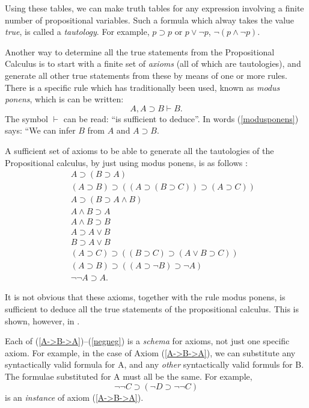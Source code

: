 Using these tables, we can make truth tables for any expression involving a finite number of propositional
variables. Such a formula which alway takes the value {\em true}, is called a {\em tautology}. For example,
$p\supset p$ or $p \vee \neg p$, $\neg (p\wedge\neg p)$.

Another way to determine all the true statements from the Propositional Calculus is to start with a finite
set of {\em axioms} (all of which are tautologies), and generate all other true statements from these by
means of one or more rules. There is a specific rule which has traditionally been used, known as {\em modus ponens},
which is can be written:
\begin{equation}\label{modusponens}
A, A \supset B \vdash B.
\end{equation}
The symbol $\vdash$ can be read: ``is sufficient to deduce''. In words (\ref{modusponens})
says: ``We can infer $B$ from $A$ and $A\supset B$.

A sufficient set of axioms to be able to generate all the tautologies of the Propositional calculus, by
just using modus ponens, is as follows \cite{Kleene52}:
\begin{eqnarray}\label{A->B->A}
&&A \supset (B\supset A) \\ \label{Ax1b}
&&(A\supset B) \supset ((A \supset (B\supset C))\supset(A\supset C))  \\
\label{^inf}
&&A \supset (B \supset A \wedge B) \\
		\label{a&b->a}
&&A\wedge B \supset A \\
		\label{a&b->b}
&&A\wedge B \supset B \\
&&A\supset A \vee B \\
&&B\supset A \vee B \\
&&(A \supset C) \supset ((B\supset C) \supset (A\vee B \supset C)) \\
\label{2ndlastaxiom}
&& (A \supset B) \supset ((A\supset \neg B) \supset \neg A) \\\label{negneg}
&& \neg\neg A \supset A.
\end{eqnarray}

It is not obvious that these axioms, together with the rule modus ponens, is sufficient
to deduce all the true statements of the propositional calculus. This is shown, however,
in \cite[Theorem 10]{Kleene52}.

Each of (\ref{A->B->A})--(\ref{negneg}) is a {\em schema}
for axioms, not just one specific axiom. For example, in the case of Axiom (\ref{A->B->A}),
we can substitute any syntactically valid formula for A, and any {\em other} syntactically valid formuls
for B. The formulae substituted for A must all be the same. For example,
$$
\neg\neg C \supset (\neg D \supset \neg\neg C)
$$
is an {\em instance} of axiom (\ref{A->B->A}).

